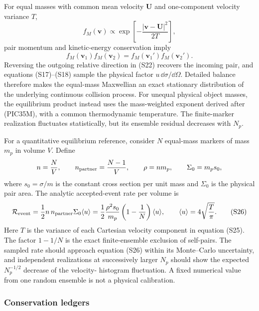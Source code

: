 For equal masses with common mean velocity \(\bm U\) and one-component
velocity variance \(T\),
\[
 f_M(\bm v)\propto
 \exp\left[-\frac{|\bm v-\bm U|^2}{2T}\right],
\]
pair momentum and kinetic-energy conservation imply
\[
 f_M(\bm v_1)f_M(\bm v_2)
 =f_M(\bm v_1')f_M(\bm v_2').                              \tag{S25}
\]
Reversing the outgoing relative direction in (S22) recovers the incoming
pair, and equations (S17)--(S18) sample the physical factor
\(u\,\dd\sigma/\dd\Omega\).  Detailed balance therefore makes the
equal-mass Maxwellian an exact stationary distribution of the underlying
continuous collision process.  For unequal physical object masses, the
equilibrium product instead uses the mass-weighted exponent derived after
(PIC35M), with a common thermodynamic temperature.
The finite-marker realization fluctuates statistically, but its ensemble
residual decreases with \(N_p\).

For a quantitative equilibrium reference, consider \(N\) equal-mass markers
of mass \(m_p\) in volume \(V\).  Define
\[
 n=\frac{N}{V},\qquad
 n_{\rm partner}=\frac{N-1}{V},\qquad
 \rho=nm_p,\qquad
 \Sigma_0=m_ps_0 ,
\]
where \(s_0=\sigma/m\) is the constant cross section per unit mass and
\(\Sigma_0\) is the physical pair area.  The analytic accepted-event rate per
volume is
\[
 {\cal R}_{\rm event}
 =\frac12 n\,n_{\rm partner}\Sigma_0\langle u\rangle
 =\frac12\frac{\rho^2s_0}{m_p}
  \left(1-\frac1N\right)\langle u\rangle,\qquad
 \left\langle u\right\rangle=4\sqrt{\frac{T}{\pi}}.         \tag{S26}
\]
Here \(T\) is the variance of each Cartesian velocity component in equation
(S25).  The factor \(1-1/N\) is the exact finite-ensemble exclusion of
self-pairs.  The sampled rate should approach equation (S26) within its
Monte--Carlo uncertainty, and independent realizations at successively larger
\(N_p\) should show the expected \(N_p^{-1/2}\) decrease of the velocity-
histogram fluctuation.  A fixed numerical value from one random ensemble is
not a physical calibration.

\subsubsection{Conservation ledgers}

